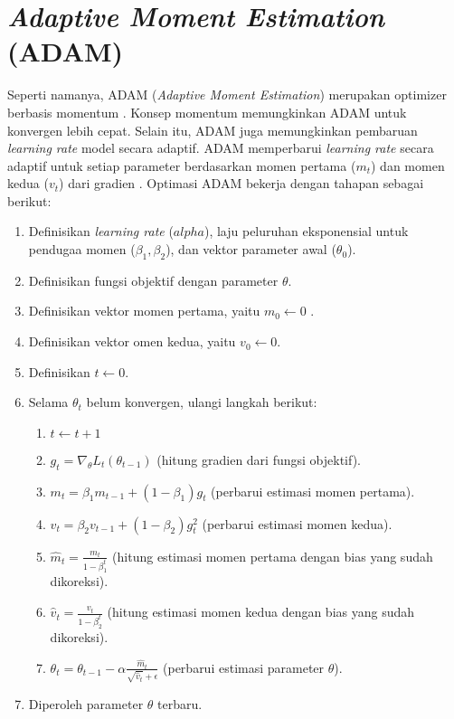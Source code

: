 \documentclass[a4paper,12pt]{report}
\begin{document}
\section{\textit{Adaptive Moment Estimation} (ADAM)}
Seperti namanya, ADAM (\textit{Adaptive Moment Estimation}) merupakan optimizer berbasis momentum \cite{sethiComprehensiveReviewOptimizers2019}. Konsep momentum memungkinkan ADAM untuk konvergen lebih cepat. Selain itu, ADAM juga memungkinkan pembaruan \textit{learning rate} model secara adaptif. ADAM memperbarui \textit{learning rate} secara adaptif untuk setiap parameter berdasarkan momen pertama ($m_t$) dan momen kedua ($v_t$) dari gradien \cite{sethiComprehensiveReviewOptimizers2019}. Optimasi ADAM bekerja dengan tahapan sebagai berikut:
\begin{enumerate}
	\item Definisikan \textit{learning rate} ($alpha$), laju peluruhan eksponensial untuk pendugaa momen ($\beta_1, \beta_2$), dan vektor parameter awal ($\theta_0$).
	\item Definisikan fungsi objektif dengan parameter $\theta$.
	\item Definisikan vektor momen pertama, yaitu $m_0 \leftarrow 0$ .
	\item Definisikan vektor omen kedua, yaitu $v_0 \leftarrow 0$.
	\item Definisikan $t \leftarrow 0$.
	\item Selama $\theta_t$ belum konvergen, ulangi langkah berikut:
	\begin{enumerate}
		\item $t \leftarrow t+1$
		\item $g_t = \nabla_\theta L_t(\theta_{t-1})$ (hitung gradien dari fungsi objektif).
		\item $m_t = \beta_1m_{t-1} + (1-\beta_1)g_t$ (perbarui estimasi momen pertama).
		\item $v_t = \beta_2v_{t-1} + (1-\beta_2)g_t^2$ (perbarui estimasi momen kedua).
		\item $\hat{m}_t = \frac{m_t}{1-\beta_1^t}$ (hitung estimasi momen pertama dengan bias yang sudah dikoreksi).
		\item $\hat{v}_t = \frac{v_t}{1-\beta_2^t}$ (hitung estimasi momen kedua dengan bias yang sudah dikoreksi).
		\item $\theta_t = \theta_{t-1} - \alpha \frac{\hat{m}_t}{\sqrt{\hat{v}_t}+\epsilon}$ (perbarui estimasi parameter $\theta$).
	\end{enumerate} 
	\item Diperoleh parameter $\theta$ terbaru.
\end{enumerate}
\end{document}
